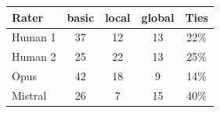 \begin{tabular}{lcccc}
\toprule
Rater & basic & local & global & Ties \\
\midrule
Human 1 & 37 & 12 & 13 & 22\% \\
Human 2 & 25 & 22 & 13 & 25\% \\
Opus & 42 & 18 & 9 & 14\% \\
Mistral & 26 & 7 & 15 & 40\% \\
\bottomrule
\end{tabular}
